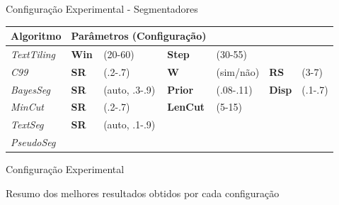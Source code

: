 \documentclass[xcolor=table]{beamer}
\begin{document}
\begin{frame}{Configuração Experimental - Segmentadores}
\small

\begin{table}
\begin{tabular}{l|llllll}
	\textbf{Algoritmo} & \multicolumn{3}{l}{\textbf{Parâmetros} (Configuração)} \\
\hline \hline

\textit{TextTiling} & \textbf{Win} &(20-60)  & \textbf{Step}   &(30-55)                  \\ 
\textit{C99} &        \textbf{SR} &(.2-.7)       & \textbf{W}      &(sim/não) & \textbf{RS}   &(3-7)        \\ 
\textit{BayesSeg} &   \textbf{SR} &(auto, .3-.9) & \textbf{Prior}  &(.08-.11) & \textbf{Disp} &(.1-.7)         \\ 
\textit{MinCut} &     \textbf{SR} &(.2-.7)       & \textbf{LenCut} &(5-15)                             \\ 
\textit{TextSeg} &    \textbf{SR} &(auto, .1-.9) &&&                                      \\ 
\textit{PseudoSeg} &  && &&&      \\ 

\end{tabular}
\end{table}


\end{frame}




\begin{frame}{Configuração Experimental}


	\center Resumo dos melhores resultados obtidos por cada configuração

 


\end{frame}
\end{document}
